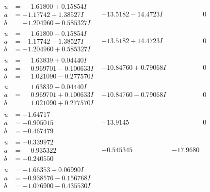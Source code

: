 \documentclass[1p]{elsarticle_modified}
\theoremstyle{definition}
\begin{document}
$$\begin{array}{c|c|c}
\begin{aligned}
u &= \phantom{-}1.61800 + 0.15854 I \\
a &= -1.17742 + 1.38527 I \\
b &= -1.204960 - 0.585327 I\end{aligned}
 & -13.5182 - 14.4723 I & \phantom{-0.000000 } 0 \\ \hline\begin{aligned}
u &= \phantom{-}1.61800 - 0.15854 I \\
a &= -1.17742 - 1.38527 I \\
b &= -1.204960 + 0.585327 I\end{aligned}
 & -13.5182 + 14.4723 I & \phantom{-0.000000 } 0 \\ \hline\begin{aligned}
u &= \phantom{-}1.63839 + 0.04440 I \\
a &= \phantom{-}0.969701 - 0.100633 I \\
b &= \phantom{-}1.021090 - 0.277570 I\end{aligned}
 & -10.84760 + 0.79068 I & \phantom{-0.000000 } 0 \\ \hline\begin{aligned}
u &= \phantom{-}1.63839 - 0.04440 I \\
a &= \phantom{-}0.969701 + 0.100633 I \\
b &= \phantom{-}1.021090 + 0.277570 I\end{aligned}
 & -10.84760 - 0.79068 I & \phantom{-0.000000 } 0 \\ \hline\begin{aligned}
u &= -1.64717\phantom{ +0.000000I} \\
a &= -0.905015\phantom{ +0.000000I} \\
b &= -0.467479\phantom{ +0.000000I}\end{aligned}
 & -13.9145\phantom{ +0.000000I} & \phantom{-0.000000 } 0 \\ \hline\begin{aligned}
u &= -0.339972\phantom{ +0.000000I} \\
a &= \phantom{-}0.935322\phantom{ +0.000000I} \\
b &= -0.240550\phantom{ +0.000000I}\end{aligned}
 & -0.545345\phantom{ +0.000000I} & -17.9680\phantom{ +0.000000I} \\ \hline\begin{aligned}
u &= -1.66353 + 0.06990 I \\
a &= -0.938576 - 0.156768 I \\
b &= -1.076900 - 0.435530 I\end{aligned}

\end{array}$$
\end{document}
